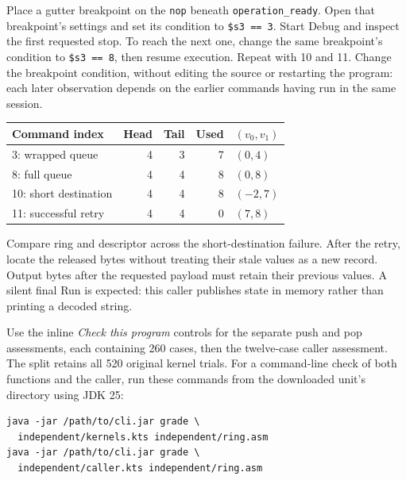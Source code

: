 Place a gutter breakpoint on the \texttt{nop} beneath \texttt{operation\_ready}.
Open that breakpoint's settings and set its condition to \texttt{\$s3 == 3}.
Start Debug and inspect the first requested stop. To reach the next one, change
the same breakpoint's condition to \texttt{\$s3 == 8}, then resume execution.
Repeat with 10 and 11. Change the breakpoint condition, without editing the source
or restarting the program: each later observation depends on the earlier commands
having run in the same session.

\begin{center}
  \begin{tabular}{lrrrl}
    \toprule
    Command index         & Head & Tail & Used & $(v_0,v_1)$ \\
    \midrule
    3: wrapped queue      & 4    & 3    & 7    & $(0,4)$     \\
    8: full queue         & 4    & 4    & 8    & $(0,8)$     \\
    10: short destination & 4    & 4    & 8    & $(-2,7)$    \\
    11: successful retry  & 4    & 4    & 0    & $(7,8)$     \\
    \bottomrule
  \end{tabular}
\end{center}

Compare ring and descriptor across the short-destination failure. After the retry,
locate the released bytes without treating their stale values as a new record.
Output bytes after the requested payload must retain their previous values. A
silent final Run is expected: this caller publishes state in memory rather than
printing a decoded string.

Use the inline \emph{Check this program} controls for the separate push and pop
assessments, each containing 260 cases, then the twelve-case caller assessment.
The split retains all 520 original kernel trials. For a command-line check of both
functions and the caller, run these commands from the downloaded unit's directory
using JDK 25:

\noindent\begin{minipage}{\linewidth}
  \begin{verbatim}
java -jar /path/to/cli.jar grade \
  independent/kernels.kts independent/ring.asm
java -jar /path/to/cli.jar grade \
  independent/caller.kts independent/ring.asm
\end{verbatim}
\end{minipage}


